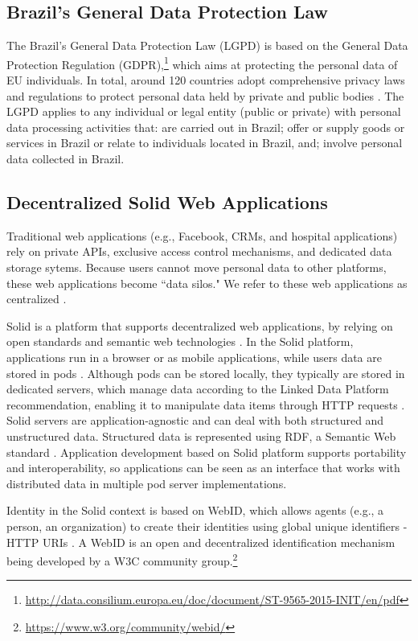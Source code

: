 \documentclass[sigconf]{acmart}
\begin{document}
\subsection{Brazil's General Data Protection Law}

The Brazil's General Data Protection Law (LGPD) is based on the General Data Protection Regulation (GDPR),\footnote{\url{http://data.consilium.europa.eu/doc/document/ST-9565-2015-INIT/en/pdf}} which aims at protecting the personal data of EU individuals. In total, around 120 countries adopt comprehensive privacy laws and regulations to protect personal data held by private and public bodies \cite{Banisar2011}. The LGPD applies to any individual or legal entity (public or private) with personal data processing activities that: are carried out in Brazil; offer or supply goods or services in Brazil or relate to individuals located in Brazil, and; involve personal data collected in Brazil.

\subsection{Decentralized Solid Web Applications}

Traditional web applications (e.g., Facebook, CRMs, and hospital applications) rely on private APIs, exclusive access control mechanisms, and dedicated data storage sytems. Because users cannot move personal data to other platforms, these web applications become ``data silos." We refer to these web applications as centralized \cite{VanKleek2012}.

Solid is a platform that supports decentralized web applications, by relying on open standards and semantic web technologies \cite{Bern09}. In the Solid platform, applications run in a browser or as mobile applications, while users data are stored in pods \cite{Bern06}. Although pods can be stored locally, they typically are stored in dedicated servers, which manage data according to the Linked Data Platform recommendation, enabling it to manipulate data items through HTTP requests \cite{LDP}. Solid servers are application-agnostic and can deal with both structured and unstructured data. Structured data is represented using RDF, a Semantic Web standard \cite{Bern06,Hollenbach2009}. Application development based on Solid platform supports portability and interoperability, so applications can be seen as an interface that works with distributed data in multiple pod server implementations.

Identity in the Solid context is based on WebID, which allows agents (e.g., a person, an organization) to create their identities using global unique identifiers - HTTP URIs \cite{Sambra}. A WebID is an open and decentralized identification mechanism being developed by a W3C community group.\footnote{\url{https://www.w3.org/community/webid/}}
\end{document}
